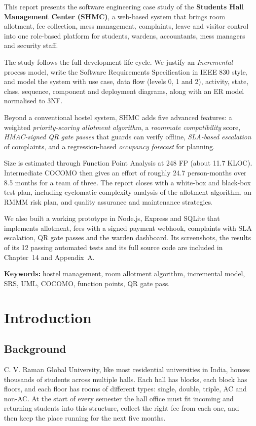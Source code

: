 \documentclass[11pt,a4paper]{report}
\begin{document}
This report presents the software engineering case study of the \textbf{Students Hall Management Center (SHMC)}, a web-based system that brings room allotment, fee collection, mess management, complaints, leave and visitor control into one role-based platform for students, wardens, accountants, mess managers and security staff.

The study follows the full development life cycle. We justify an \emph{Incremental} process model, write the Software Requirements Specification in IEEE 830 style, and model the system with use case, data flow (levels 0, 1 and 2), activity, state, class, sequence, component and deployment diagrams, along with an ER model normalised to 3NF.

Beyond a conventional hostel system, SHMC adds five advanced features: a weighted \emph{priority-scoring allotment algorithm}, a \emph{roommate compatibility} score, \emph{HMAC-signed QR gate passes} that guards can verify offline, \emph{SLA-based escalation} of complaints, and a regression-based \emph{occupancy forecast} for planning.

Size is estimated through Function Point Analysis at 248 FP (about 11.7 KLOC). Intermediate COCOMO then gives an effort of roughly 24.7 person-months over 8.5 months for a team of three. The report closes with a white-box and black-box test plan, including cyclomatic complexity analysis of the allotment algorithm, an RMMM risk plan, and quality assurance and maintenance strategies.

We also built a working prototype in Node.js, Express and SQLite that implements allotment, fees with a signed payment webhook, complaints with SLA escalation, QR gate passes and the warden dashboard. Its screenshots, the results of its 12 passing automated tests and its full source code are included in Chapter~14 and Appendix~A.

\vspace{0.5cm}
\noindent\textbf{Keywords:} hostel management, room allotment algorithm, incremental model, SRS, UML, COCOMO, function points, QR gate pass.

\tableofcontents
\listoffigures

\clearpage
{}

\chapter{Introduction}

\section{Background}
C. V. Raman Global University, like most residential universities in India, houses thousands of students across multiple halls. Each hall has blocks, each block has floors, and each floor has rooms of different types: single, double, triple, AC and non-AC. At the start of every semester the hall office must fit incoming and returning students into this structure, collect the right fee from each one, and then keep the place running for the next five months.
\end{document}

